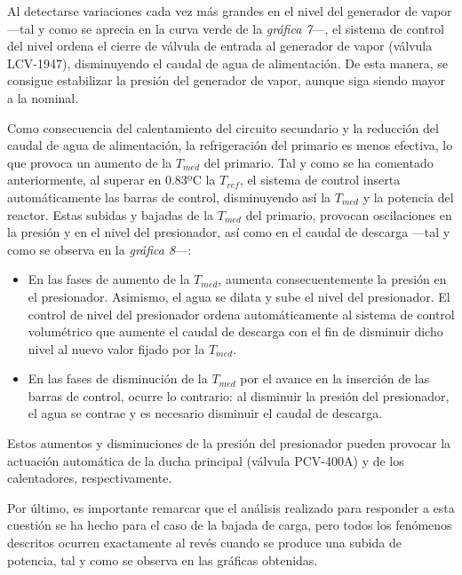 Al detectarse variaciones cada vez más grandes en el nivel del generador de vapor ---tal y como se aprecia en la curva verde de la \textit{gráfica 7}---, el sistema de control del nivel ordena el cierre de válvula de entrada al generador de vapor (válvula LCV-1947), disminuyendo el caudal de agua de alimentación. De esta manera, se consigue estabilizar la presión del generador de vapor, aunque siga siendo mayor a la nominal. 

Como consecuencia del calentamiento del circuito secundario y la reducción del caudal de agua de alimentación, la refrigeración del primario es menos efectiva, lo que provoca un aumento de la $T_{med}$ del primario. Tal y como se ha comentado anteriormente, al superar en 0.83ºC la $T_{ref}$, el sistema de control inserta automáticamente las barras de control, disminuyendo así la $T_{med}$ y la potencia del reactor. Estas subidas y bajadas de la $T_{med}$ del primario, provocan oscilaciones en la presión y en el nivel del presionador, así como en el caudal de descarga ---tal y como se observa en la \textit{gráfica 8}---:

\begin{itemize}
  \item En las fases de aumento de la $T_{med}$, aumenta consecuentemente la presión en el presionador. Asimismo, el agua se dilata y sube el nivel del presionador. El control de nivel del presionador ordena automáticamente al sistema de control volumétrico que aumente el caudal de descarga con el fin de disminuir dicho nivel al nuevo valor fijado por la $T_{med}$. 
  \item En las fases de disminución de la $T_{med}$ por el avance en la inserción de las barras de control, ocurre lo contrario: al disminuir la presión del presionador, el agua se contrae y es necesario disminuir el caudal de descarga.
\end{itemize}

Estos aumentos y disminuciones de la presión del presionador pueden provocar la actuación automática de la ducha principal (válvula PCV-400A) y de los calentadores, respectivamente.

Por último, es importante remarcar que el análisis realizado para responder a esta cuestión se ha hecho para el caso de la bajada de carga, pero todos los fenómenos descritos ocurren exactamente al revés cuando se produce una subida de potencia, tal y como se observa en las gráficas obtenidas.

